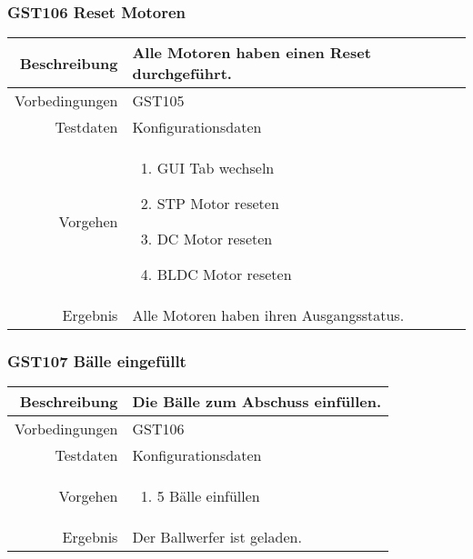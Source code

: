 \subsubsection{GST106 Reset Motoren}
\begin{table}[h!]
	\renewcommand{\arraystretch}{1.5}
	\begin{tabular}{|r|p{13cm}|}
		\hline Beschreibung & Alle Motoren haben einen Reset durchgeführt. \\ 
		\hline Vorbedingungen &  GST105\\ 
		\hline Testdaten & Konfigurationsdaten \\ 
		\hline Vorgehen & 
		\begin{enumerate}
			\item GUI Tab wechseln
			\item STP Motor reseten
			\item DC Motor reseten
			\item BLDC Motor reseten
		\end{enumerate} \\ 
		\hline Ergebnis & Alle Motoren haben ihren Ausgangsstatus. \\ 
		\hline 
	\end{tabular}
\end{table}

\subsubsection{GST107 Bälle eingefüllt}
\begin{table}[h!]
	\renewcommand{\arraystretch}{1.5}
	\begin{tabular}{|r|p{13cm}|}
		\hline Beschreibung & Die Bälle zum Abschuss einfüllen. \\ 
		\hline Vorbedingungen &  GST106\\ 
		\hline Testdaten & Konfigurationsdaten \\ 
		\hline Vorgehen & 
		\begin{enumerate}
			\item 5 Bälle einfüllen
		\end{enumerate} \\ 
		\hline Ergebnis & Der Ballwerfer ist geladen. \\ 
		\hline 
	\end{tabular}
\end{table}

